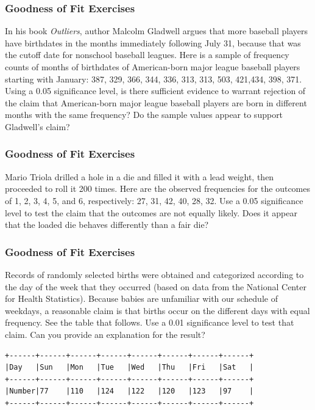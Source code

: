 \documentclass[xcolor=dvipsnames]{beamer}
\begin{document}
\begin{frame}
  \frametitle{Goodness of Fit Exercises}
  {\ubung} In his book \emph{Outliers}, author Malcolm Gladwell argues
  that more baseball players have birthdates in the months immediately
  following July 31, because that was the cutoff date for nonschool
  baseball leagues. Here is a sample of frequency counts of months of
  birthdates of American-born major league baseball players starting
  with January: 387, 329, 366, 344, 336, 313, 313, 503, 421,434, 398,
  371. Using a 0.05 significance level, is there sufficient evidence
  to warrant rejection of the claim that American-born major league
  baseball players are born in different months with the same
  frequency? Do the sample values appear to support Gladwell's claim?
\end{frame}

\begin{frame}
  \frametitle{Goodness of Fit Exercises}
  {\ubung} Mario Triola drilled a hole in a die and filled it with a
  lead weight, then proceeded to roll it 200 times. Here are the
  observed frequencies for the outcomes of 1, 2, 3, 4, 5, and 6,
  respectively: 27, 31, 42, 40, 28, 32. Use a 0.05 significance level
  to test the claim that the outcomes are not equally likely. Does it
  appear that the loaded die behaves differently than a fair die?
\end{frame}

\begin{frame}[fragile]
  \frametitle{Goodness of Fit Exercises}
  {\ubung} Records of randomly selected births were obtained and
  categorized according to the day of the week that they occurred
  (based on data from the National Center for Health Statistics).
  Because babies are unfamiliar with our schedule of weekdays, a
  reasonable claim is that births occur on the different days with
  equal frequency. See the table that follows. Use a 0.01 significance
  level to test that claim. Can you provide an explanation for the
  result?
\begin{verbatim}
+------+------+------+------+------+------+------+------+
|Day   |Sun   |Mon   |Tue   |Wed   |Thu   |Fri   |Sat   |
+------+------+------+------+------+------+------+------+
|Number|77    |110   |124   |122   |120   |123   |97    |
+------+------+------+------+------+------+------+------+
\end{verbatim}
\end{frame}
\end{document}
